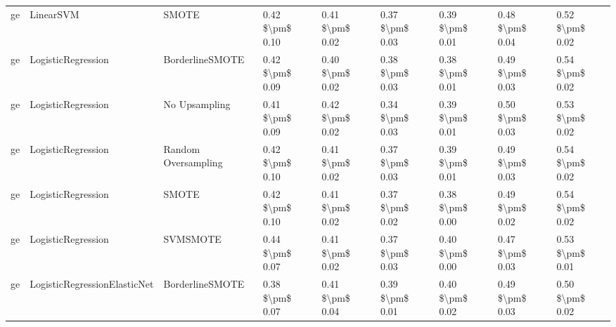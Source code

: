 \begin{tabular}{lllllllll}
      ge &                       LinearSVM &                         SMOTE &     0.42 \$\textbackslash pm\$ 0.10 &           0.41 \$\textbackslash pm\$ 0.02 &       0.37 \$\textbackslash pm\$ 0.03 &        0.39 \$\textbackslash pm\$ 0.01 &                         0.48 \$\textbackslash pm\$ 0.04 &     0.52 \$\textbackslash pm\$ 0.02 \\
      ge &              LogisticRegression &               BorderlineSMOTE &     0.42 \$\textbackslash pm\$ 0.09 &           0.40 \$\textbackslash pm\$ 0.02 &       0.38 \$\textbackslash pm\$ 0.03 &        0.38 \$\textbackslash pm\$ 0.01 &                         0.49 \$\textbackslash pm\$ 0.03 &     0.54 \$\textbackslash pm\$ 0.02 \\
      ge &              LogisticRegression &                 No Upsampling &     0.41 \$\textbackslash pm\$ 0.09 &           0.42 \$\textbackslash pm\$ 0.02 &       0.34 \$\textbackslash pm\$ 0.03 &        0.39 \$\textbackslash pm\$ 0.01 &                         0.50 \$\textbackslash pm\$ 0.03 &     0.53 \$\textbackslash pm\$ 0.02 \\
      ge &              LogisticRegression &           Random Oversampling &     0.42 \$\textbackslash pm\$ 0.10 &           0.41 \$\textbackslash pm\$ 0.02 &       0.37 \$\textbackslash pm\$ 0.03 &        0.39 \$\textbackslash pm\$ 0.01 &                         0.49 \$\textbackslash pm\$ 0.03 &     0.54 \$\textbackslash pm\$ 0.02 \\
      ge &              LogisticRegression &                         SMOTE &     0.42 \$\textbackslash pm\$ 0.10 &           0.41 \$\textbackslash pm\$ 0.02 &       0.37 \$\textbackslash pm\$ 0.02 &        0.38 \$\textbackslash pm\$ 0.00 &                         0.49 \$\textbackslash pm\$ 0.02 &     0.54 \$\textbackslash pm\$ 0.02 \\
      ge &              LogisticRegression &                      SVMSMOTE &     0.44 \$\textbackslash pm\$ 0.07 &           0.41 \$\textbackslash pm\$ 0.02 &       0.37 \$\textbackslash pm\$ 0.03 &        0.40 \$\textbackslash pm\$ 0.00 &                         0.47 \$\textbackslash pm\$ 0.03 &     0.53 \$\textbackslash pm\$ 0.01 \\
      ge &    LogisticRegressionElasticNet &               BorderlineSMOTE &     0.38 \$\textbackslash pm\$ 0.07 &           0.41 \$\textbackslash pm\$ 0.04 &       0.39 \$\textbackslash pm\$ 0.01 &        0.40 \$\textbackslash pm\$ 0.02 &                         0.49 \$\textbackslash pm\$ 0.03 &     0.50 \$\textbackslash pm\$ 0.02 \\

\end{tabular}
